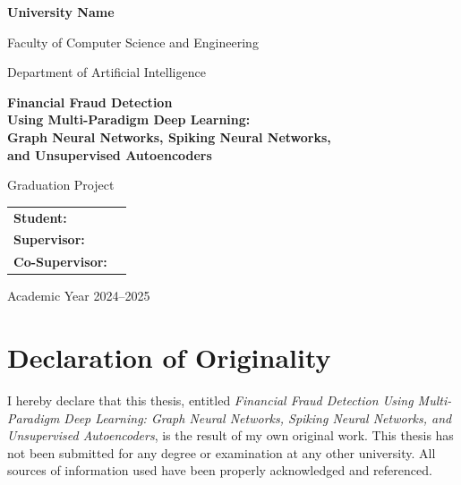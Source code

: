 
\begin{titlepage}
\centering
\vspace*{1cm}
{\Large\bfseries University Name\par}
\vspace{0.5cm}
{\large Faculty of Computer Science and Engineering\par}
\vspace{0.3cm}
{\large Department of Artificial Intelligence\par}
\vspace{2cm}
{\Huge\bfseries Financial Fraud Detection\\Using Multi-Paradigm Deep Learning:\\Graph Neural Networks, Spiking Neural Networks,\\and Unsupervised Autoencoders\par}
\vspace{1cm}
{\Large Graduation Project\par}
\vspace{2cm}
\begin{tabular}{ll}
\textbf{Student:} & \\[4pt]
\textbf{Supervisor:} & \\[4pt]
\textbf{Co-Supervisor:} & \\
\end{tabular}
\vspace{2cm}
{\Large Academic Year 2024--2025\par}
\vfill
\end{titlepage}

\chapter*{Declaration of Originality}

I hereby declare that this thesis, entitled \emph{Financial Fraud Detection Using Multi-Paradigm Deep Learning: Graph Neural Networks, Spiking Neural Networks, and Unsupervised Autoencoders}, is the result of my own original work. This thesis has not been submitted for any degree or examination at any other university. All sources of information used have been properly acknowledged and referenced.

